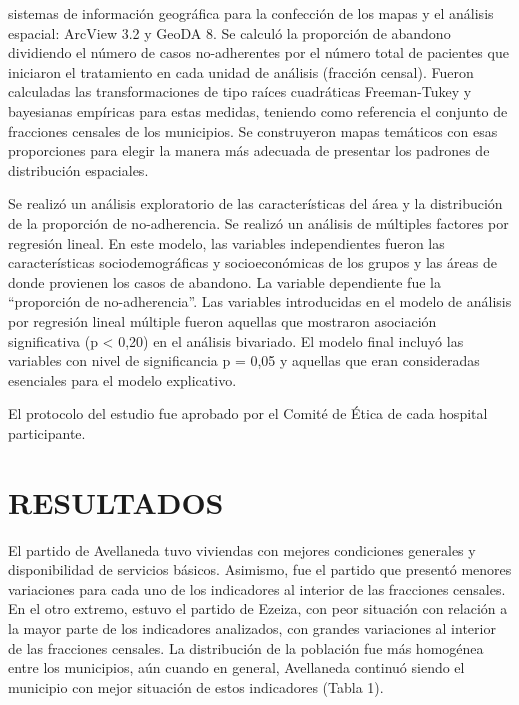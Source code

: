 \begin{multicols}{2}
sistemas de información geográfica para la confección de los mapas y el análisis espacial:\allowbreak{} ArcView 3.\allowbreak{}2 y GeoDA 8.\allowbreak{} Se calculó la proporción de abandono dividiendo el número de casos no-\allowbreak{}adherentes por el número total de pacientes que iniciaron el tratamiento en cada unidad de análisis (\allowbreak{}fracción censal)\allowbreak{}.\allowbreak{} Fueron calculadas las transformaciones de tipo raíces cuadráticas Freeman-\allowbreak{}Tukey y bayesianas empíricas para estas medidas,\allowbreak{} teniendo como referencia el conjunto de fracciones censales de los municipios.\allowbreak{} Se construyeron mapas temáticos con esas proporciones para elegir la manera más adecuada de presentar los padrones de distribución espaciales.\allowbreak{}\par{}Se realizó un análisis exploratorio de las características del área y la distribución de la proporción de no-\allowbreak{}adherencia.\allowbreak{} Se realizó un análisis de múltiples factores por regresión lineal.\allowbreak{} En este modelo,\allowbreak{} las variables independientes fueron las características sociodemográficas y socioeconómicas de los grupos y las áreas de donde provienen los casos de abandono.\allowbreak{} La variable dependiente fue la “proporción de no-\allowbreak{}adherencia”.\allowbreak{} Las variables introducidas en el modelo de análisis por regresión lineal múltiple fueron aquellas que mostraron asociación significativa (\allowbreak{}p < 0,\allowbreak{}20)\allowbreak{} en el análisis bivariado.\allowbreak{} El modelo final incluyó las variables con nivel de significancia p = 0,\allowbreak{}05 y aquellas que eran consideradas esenciales para el modelo explicativo.\allowbreak{}\par{}El protocolo del estudio fue aprobado por el Comité de Ética de cada hospital participante.\allowbreak{}
\section*{RESULTADOS}
\par{}El partido de Avellaneda tuvo viviendas con mejores condiciones generales y disponibilidad de servicios básicos.\allowbreak{} Asimismo,\allowbreak{} fue el partido que presentó menores variaciones para cada uno de los indicadores al interior de las fracciones censales.\allowbreak{} En el otro extremo,\allowbreak{} estuvo el partido de Ezeiza,\allowbreak{} con peor situación con relación a la mayor parte de los indicadores analizados,\allowbreak{} con grandes variaciones al interior de las fracciones censales.\allowbreak{} La distribución de la población fue más homogénea entre los municipios,\allowbreak{} aún cuando en general,\allowbreak{} Avellaneda continuó siendo el municipio con mejor situación de estos indicadores (\allowbreak{}Tabla 1)\allowbreak{}.\allowbreak{}\par{}\end{multicols}
